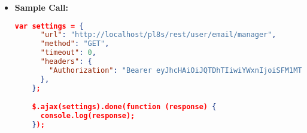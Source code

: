 \begin{itemize}
	\item \textbf{Sample Call:}
	    \begin{lstlisting}[language=json]
    var settings = {
      "url": "http://localhost/pl8s/rest/user/email/manager",
      "method": "GET",
      "timeout": 0,
      "headers": {
        "Authorization": "Bearer eyJhcHAiOiJQTDhTIiwiYWxnIjoiSFM1MTIifQ.eyJ1aWQiOjEsInJvbCI6ImFkbWluIiwic3RyIjoi Y3VzX1B3OHAyQlk2YkZYMm1iIiwiZGF0IjoxNzE0MzIwOTY0NzI5fQ.T1y3Lufb8wi1AxP6uymJUrED Ko5dfgUe0seNIdsSw6yGQ_2R0awineJsMSa9TQu6lIy8dSH12JO9LPNzGtVJkg"    
      },
    };

    $.ajax(settings).done(function (response) {
      console.log(response);
    });
	    \end{lstlisting}
	
\end{itemize}
